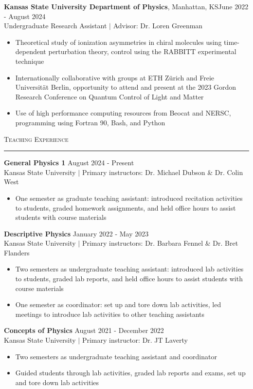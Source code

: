 \documentclass{article}
\newcommand{\sect}[1]{
\noindent\large{\textsc{#1}}\\[-6pt]\normalsize{\noindent\rule{\textwidth}{0.5pt}}
}
\begin{document}
\textbf{Kansas State University Department of Physics}, Manhattan, KS\hfill June 2022 - August 2024\\
{Undergraduate Research Assistant $ | $ Advisor: Dr. Loren Greenman} \begin{itemize}
	\item Theoretical study of ionization asymmetries in chiral molecules using time-dependent perturbation theory, control using the RABBITT experimental technique
	\item Internationally collaborative with groups at ETH Z\"{u}rich and Freie Universität Berlin, opportunity to attend and present at the 2023 Gordon Research Conference on Quantum Control of Light and Matter
	\item Use of high performance computing resources from Beocat and NERSC, programming using Fortran 90, Bash, and Python
\end{itemize}
\sect{Teaching Experience}
\textbf{General Physics 1} \hfill August 2024 - Present\\
Kansas State University $ | $ Primary instructors: Dr. Michael Dubson \& Dr. Colin West
\begin{itemize}
	\item One semester as graduate teaching assistant: introduced recitation activities to students, graded homework assignments, and held office hours to assist students with course materials
\end{itemize}
\textbf{Descriptive Physics} \hfill January 2022 - May 2023\\
Kansas State University $ | $ Primary instructors: Dr. Barbara Fennel \& Dr. Bret Flanders
\begin{itemize}
	\item Two semesters as undergraduate teaching assistant: introduced lab activities to students, graded lab reports, and held office hours to assist students with course materials
	\item One semester as coordinator: set up and tore down lab activities, led meetings to introduce lab activities to other teaching assistants
\end{itemize}
\textbf{Concepts of Physics} \hfill August 2021 - December 2022\\
Kansas State University $ | $ Primary instructor: Dr. JT Laverty
\begin{itemize}
	\item Two semesters as undergraduate teaching assistant and coordinator
	\item Guided students through lab activities, graded lab reports and exams, set up and tore down lab activities\vspace{-12pt}
\end{itemize}
\end{document}
